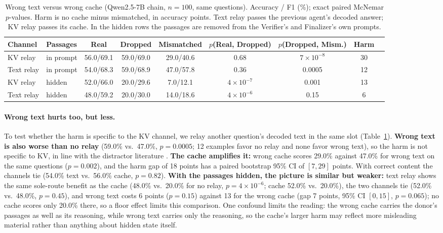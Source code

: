 \documentclass[11pt]{article}
\begin{document}
\begin{table}[t]
\centering
\small
\caption{Wrong text versus wrong cache (Qwen2.5-7B chain, $n{=}100$, same
questions). Accuracy / F1 (\%); exact paired McNemar $p$-values. Harm is no cache
minus mismatched, in accuracy points. Text relay passes the previous agent's
decoded answer; KV relay passes its cache. In the hidden rows the passages are
removed from the Verifier's and Finalizer's own prompts.}
\label{tab:textctrl}
\begin{tabular}{llccccccc}
\toprule
\textbf{Channel} & \textbf{Passages} & \textcolor{realblue}{\textbf{Real}} & \textbf{Dropped} & \textcolor{wrongred}{\textbf{Mismatched}} & $p$(Real, Dropped) & $p$(Dropped, Mism.) & \textbf{Harm} \\
\midrule
KV relay   & in prompt & 56.0/69.1 & 59.0/69.0 & 29.0/40.6 & 0.68 & $7\times10^{-8}$ & 30 \\
Text relay & in prompt & 54.0/68.3 & 59.0/68.9 & 47.0/57.8 & 0.36 & 0.0005           & 12 \\
\midrule
KV relay   & hidden    & 52.0/66.0 & 20.0/29.6 & 7.0/12.1  & $4\times10^{-7}$ & 0.001 & 13 \\
Text relay & hidden    & 48.0/59.2 & 20.0/30.0 & 14.0/18.6 & $4\times10^{-6}$ & 0.15  & 6 \\
\bottomrule
\end{tabular}
\end{table}

\paragraph{Wrong text hurts too, but less.} To test whether the harm is specific
to the KV channel, we relay another question's decoded text in the same slot
(Table~\ref{tab:textctrl}). \textbf{Wrong text is also worse than no relay} (59.0\%
vs.\ 47.0\%, $p=0.0005$; 12 examples favor no relay and none favor wrong text), so
the harm is not specific to KV, in line with the distractor literature
\citep{shi2023distracted}. \textbf{The cache amplifies it:} wrong cache scores 29.0\%
against 47.0\% for wrong text on the same questions ($p=0.002$), and the harm gap of
18 points has a paired bootstrap 95\% CI of $[7,29]$ points. With correct content the
channels tie (54.0\% text vs.\ 56.0\% cache, $p=0.82$). \textbf{With the passages
hidden, the picture is similar but weaker:} text relay shows the same sole-route
benefit as the cache (48.0\% vs.\ 20.0\% for no relay, $p=4\times10^{-6}$; cache
52.0\% vs.\ 20.0\%), the two channels tie (52.0\% vs.\ 48.0\%, $p=0.45$), and wrong
text costs 6 points ($p=0.15$) against 13 for the wrong cache (gap 7 points, 95\% CI
$[0,15]$, $p=0.065$); no cache scores only 20.0\% there, so a floor effect limits
this comparison. One confound limits the reading: the wrong cache carries the donor's passages as well as its reasoning,
while wrong text carries only the reasoning, so the cache's larger harm may reflect
more misleading material rather than anything about hidden state itself.
\end{document}
